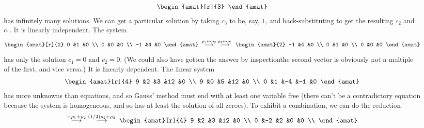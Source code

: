 \begin{exercises}
\begin{answer}
\begin{exparts}
\begin{equation*}
\begin{amat}[r]{3}
            \end{amat}
          \end{equation*}
          has infinitely many solutions.
          We can get a particular solution by taking $c_3$ to be, say,
          $1$, and back-substituting to get the resulting $c_2$ and $c_1$.
        \partsitem It is linearly independent.
          The system
          \begin{equation*}
            \begin{amat}[r]{2}
              0  &1  &0  \\
              0  &0  &0  \\
              -1 &4  &0
            \end{amat}
            \;\grstep{\rho_1\leftrightarrow\rho_2}
            \;\grstep{\rho_3\leftrightarrow\rho_1}\;
            \begin{amat}{2}
              -1 &4  &0  \\
              0  &1  &0  \\
              0  &0  &0  
            \end{amat}
          \end{equation*}
          has only the solution $c_1=0$ and $c_2=0$.
          (We could also have gotten the answer by inspection\Dash the second
          vector is obviously not a multiple of the first, and vice versa.)
        \partsitem It is linearly dependent.
          The linear system
          \begin{equation*}
            \begin{amat}[r]{4}
              9  &2  &3  &12  &0  \\
              9  &0  &5  &12  &0  \\
              0  &1  &-4 &-1  &0
            \end{amat}
          \end{equation*}
          has more unknowns than equations, and so Gauss' method
          must end with at least one variable free (there can't be a 
          contradictory equation because the system is homogeneous, and so
          has at least the solution of all zeroes).
          To exhibit a combination, we can do the reduction 
          \begin{equation*}
            \grstep{-\rho_1+\rho_2}
            \;\grstep{(1/2)\rho_2+\rho_3}\;
            \begin{amat}[r]{4}
              9  &2  &3  &12  &0  \\
              0  &-2 &2  &0   &0  \\

\end{amat}
\end{equation*}
\end{exparts}
\end{answer}
\end{exercises}
